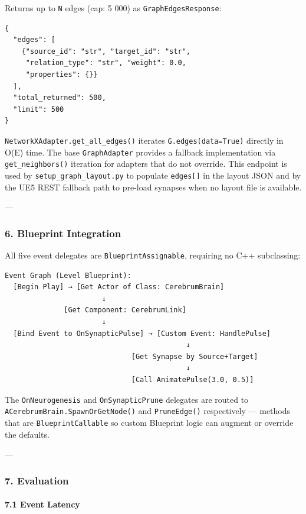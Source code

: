Returns up to \texttt{N} edges (cap: 5 000) as \texttt{GraphEdgesResponse}:

\begin{lstlisting}
{
  "edges": [
    {"source_id": "str", "target_id": "str",
     "relation_type": "str", "weight": 0.0,
     "properties": {}}
  ],
  "total_returned": 500,
  "limit": 500
}
\end{lstlisting}

\texttt{NetworkXAdapter.get\_all\_edges()} iterates \texttt{G.edges(data=True)} directly in O(E) time. The base \texttt{GraphAdapter} provides a fallback imple\-mentation via \texttt{get\_neighbors()} iteration for adapters that do not override. This endpoint is used by \texttt{setup\_graph\_layout.py} to populate \texttt{edges[]} in the layout JSON and by the UE5 REST fallback path to pre-load synapses when no layout file is available.

---

\subsubsection{6. Blueprint Integration}

All five event delegates are \texttt{BlueprintAssignable}, requiring no C++ subclassing:

\begin{lstlisting}
Event Graph (Level Blueprint):
  [Begin Play] → [Get Actor of Class: CerebrumBrain]
                       ↓
              [Get Component: CerebrumLink]
                       ↓
  [Bind Event to OnSynapticPulse] → [Custom Event: HandlePulse]
                                           ↓
                              [Get Synapse by Source+Target]
                                           ↓
                              [Call AnimatePulse(3.0, 0.5)]
\end{lstlisting}

The \texttt{OnNeurogenesis} and \texttt{OnSynapticPrune} delegates are routed to \texttt{ACerebrumBrain.SpawnOrGetNode()} and \texttt{PruneEdge()} respe\-ctively — methods that are \texttt{BlueprintCallable} so custom Blueprint logic can augment or override the defaults.

---

\subsubsection{7. Evaluation}

\paragraph{7.1 Event Latency}

